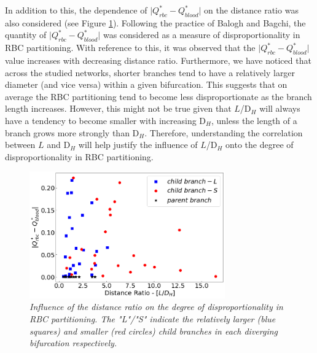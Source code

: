 \noindent In addition to this, the dependence of $\lvert Q^{*}_{rbc} - Q^{*}_{blood} \rvert$ on the distance ratio was also considered (see Figure \ref{DisproportionalityIndexDistanceRatio}). Following the practice of Balogh and Bagchi\cite{Balogh2018}, the quantity of $\lvert Q^{*}_{rbc} - Q^{*}_{blood} \rvert$ was considered as a measure of disproportionality in RBC partitioning. With reference to this, it was observed that the $\lvert Q^{*}_{rbc} - Q^{*}_{blood} \rvert$ value increases with decreasing distance ratio. Furthermore, we have noticed that across the studied networks, shorter branches tend to have a relatively larger diameter (and vice versa) within a given bifurcation. This suggests that on average the RBC partitioning tend to become less disproportionate as the branch length increases. However, this might not be true given that $L$/D$_{H}$ will always have a tendency to become smaller with increasing D$_{H}$, unless the length of a branch grows more strongly than D$_{H}$. Therefore, understanding the correlation between $L$ and D$_{H}$ will help justify the influence of $L$/D$_{H}$ onto the degree of disproportionality in RBC partitioning.\\



\begin{figure}[H]
\centering
\includegraphics[width=0.75\textwidth]{images/DisproportionalityIndexDistanceRatio.png}
\caption{\textit{Influence of the distance ratio on the degree of disproportionality in RBC partitioning. The "L"/"S" indicate the relatively larger (blue squares) and smaller (red circles) child branches in each diverging bifurcation respectively.} \label{DisproportionalityIndexDistanceRatio}}
\end{figure}
